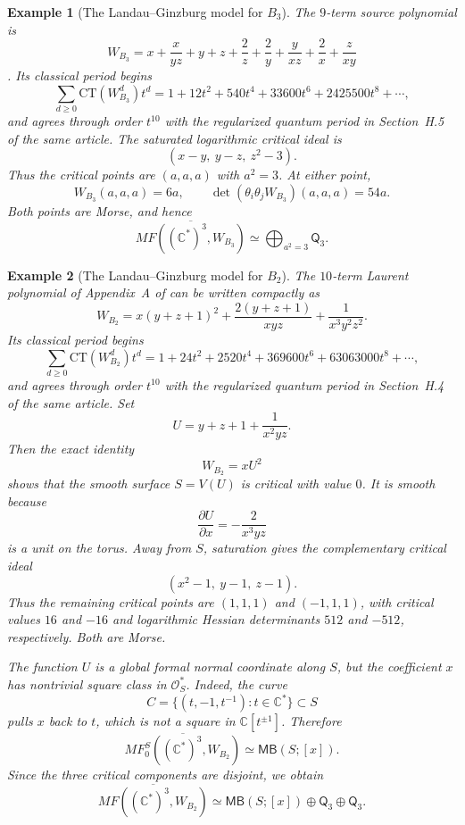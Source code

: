 \documentclass[11pt]{amsart}
\newtheorem{example}{Example}[section]
\newcommand{\MorseCat}[1]{\mathsf{Q}_{#1}}
\newcommand{\MBtwcat}[2]{\mathsf{MB}(#1;[#2])}
\begin{document}
\begin{example}[The Landau--Ginzburg model for $B_3$]
The $9$-term source polynomial is
\[
W_{B_3}=x+\frac{x}{yz}+y+z+\frac2z+\frac2y
+\frac{y}{xz}+\frac2x+\frac{z}{xy}
\]
\cite{CoatesCortiGalkinKasprzyk2016}. Its classical period begins
\[
\sum_{d\geq0}\mathrm{CT}(W_{B_3}^d)t^d
=1+12t^2+540t^4+33600t^6+2425500t^8+\cdots,
\]
and agrees through order $t^{10}$ with the regularized quantum period in
Section~H.5 of the same article. The saturated logarithmic critical ideal is
\[
(x-y,\ y-z,\ z^2-3).
\]
Thus the critical points are $(a,a,a)$ with $a^2=3$. At either point,
\[
W_{B_3}(a,a,a)=6a,
\qquad
\det(\theta_i\theta_jW_{B_3})(a,a,a)=54a.
\]
Both points are Morse, and hence
\[
\overline{MF((\mathbb C^*)^3,W_{B_3})}
\simeq\bigoplus_{a^2=3}\MorseCat{3}.
\]
\end{example}

\begin{example}[The Landau--Ginzburg model for $B_2$]
The $10$-term Laurent polynomial of Appendix~A of
\cite{CoatesCortiGalkinKasprzyk2016} can be written compactly as
\[
W_{B_2}
=x(y+z+1)^2+\frac{2(y+z+1)}{xyz}+\frac1{x^3y^2z^2}.
\]
Its classical period begins
\[
\sum_{d\geq0}\mathrm{CT}(W_{B_2}^d)t^d
=1+24t^2+2520t^4+369600t^6+63063000t^8+\cdots,
\]
and agrees through order $t^{10}$ with the regularized quantum period in
Section~H.4 of the same article. Set
\[
U=y+z+1+\frac1{x^2yz}.
\]
Then the exact identity
\[
W_{B_2}=xU^2
\]
shows that the smooth surface $S=V(U)$ is critical with value $0$. It is
smooth because
\[
\frac{\partial U}{\partial x}=-\frac2{x^3yz}
\]
is a unit on the torus. Away from $S$, saturation gives the complementary
critical ideal
\[
(x^2-1,\ y-1,\ z-1).
\]
Thus the remaining critical points are $(1,1,1)$ and $(-1,1,1)$, with
critical values $16$ and $-16$ and logarithmic Hessian determinants $512$ and
$-512$, respectively. Both are Morse.

The function $U$ is a global formal normal coordinate along $S$, but the
coefficient $x$ has nontrivial square class in $\mathcal O_S^*$. Indeed, the
curve
\[
C=\{(t,-1,t^{-1}):t\in\mathbb C^*\}\subset S
\]
pulls $x$ back to $t$, which is not a square in $\mathbb C[t^{\pm1}]$.
Therefore
\[
\overline{MF_0^S((\mathbb C^*)^3,W_{B_2})}
\simeq\MBtwcat{S}{x}.
\]
Since the three critical components are disjoint, we obtain
\[
\overline{MF((\mathbb C^*)^3,W_{B_2})}
\simeq
\MBtwcat{S}{x}\oplus\MorseCat{3}\oplus\MorseCat{3}.
\]
\end{example}
\end{document}
